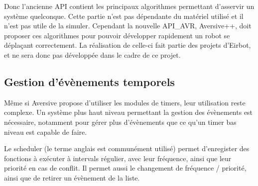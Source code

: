 Donc l'ancienne API contient les principaux algorithmes permettant d'asservir un système quelconque. Cette partie n'est pas dépendante du matériel utilisé et il n'est pas utile de la simuler. 
Cependant la nouvelle API_AVR, Aversive++,  doit proposer ces algorithmes pour pouvoir développer rapidement un robot se déplaçant correctement. La réalisation de celle-ci fait partie des projets d'Eirbot, et ne sera donc pas développée dans le cadre de ce projet.


\subsection{Gestion d'évènements temporels}

Même si Aversive propose d'utiliser les modules de timers, leur utilisation reste complexe. Un système plus haut niveau permettant la gestion des évènements est nécessaire, notamment pour gérer plus d'évènements que ce qu'un timer bas niveau est capable de faire.

Le scheduler (le terme anglais est communément utilisé) permet d'enregister des fonctions à exécuter à intervals régulier, avec leur fréquence, ainsi que leur priorité en cas de conflit. Il permet aussi le changement de fréquence / priorité, ainsi que de retirer un évènement de la liste.
\clearpage
